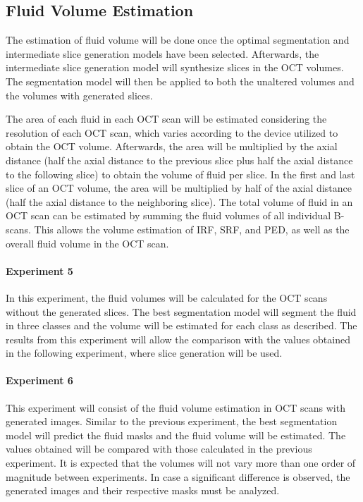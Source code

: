 \subsection{Fluid Volume Estimation}
The estimation of fluid volume will be done once the optimal segmentation and intermediate slice generation models have been selected. Afterwards, the intermediate slice generation model will synthesize slices in the OCT volumes. The segmentation model will then be applied to both the unaltered volumes and the volumes with generated slices. 
\par
The area of each fluid in each OCT scan will be estimated considering the resolution of each OCT scan, which varies according to the device utilized to obtain the OCT volume. Afterwards, the area will be multiplied by the axial distance (half the axial distance to the previous slice plus half the axial distance to the following slice) to obtain the volume of fluid per slice. In the first and last slice of an OCT volume, the area will be multiplied by half of the axial distance (half the axial distance to the neighboring slice). The total volume of fluid in an OCT scan can be estimated by summing the fluid volumes of all individual B-scans. This allows the volume estimation of IRF, SRF, and PED, as well as the overall fluid volume in the OCT scan.

\paragraph{Experiment 5}
In this experiment, the fluid volumes will be calculated for the OCT scans without the generated slices. The best segmentation model will segment the fluid in three classes and the volume will be estimated for each class as described. The results from this experiment will allow the comparison with the values obtained in the following experiment, where slice generation will be used.

\paragraph{Experiment 6}
This experiment will consist of the fluid volume estimation in OCT scans with generated images. Similar to the previous experiment, the best segmentation model will predict the fluid masks and the fluid volume will be estimated. The values obtained will be compared with those calculated in the previous experiment. It is expected that the volumes will not vary more than one order of magnitude between experiments. In case a significant difference is observed, the generated images and their respective masks must be analyzed.